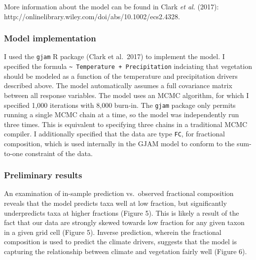 \documentclass[11pt]{article}
\begin{document}
More information about the model can be found in Clark \emph{et al.}
(2017): http://onlinelibrary.wiley.com/doi/abs/10.1002/ecs2.4328.

\hypertarget{model-implementation}{%
\subsubsection{Model implementation}\label{model-implementation}}

I used the \texttt{gjam} R package (Clark et al.~2017) to implement the
model. I specified the formula
\texttt{\textasciitilde{}\ Temperature\ +\ Precipitation} indciating
that vegetation should be modeled as a function of the temperature and
precipitation drivers described above. The model automatically assumes a
full covariance matrix between all response variables. The model uses an
MCMC algorithm, for which I specified 1,000 iterations with 8,000
burn-in. The \texttt{gjam} package only permits running a single MCMC
chain at a time, so the model was independently run three times. This is
equivalent to specifying three chains in a traditional MCMC compiler. I
additionally specified that the data are type \texttt{FC}, for
fractional composition, which is used internally in the GJAM model to
conform to the sum-to-one constraint of the data.

    \hypertarget{preliminary-results}{%
\subsubsection{Preliminary results}\label{preliminary-results}}

An examination of in-sample prediction vs.~observed fractional
composition reveals that the model predicts taxa well at low fraction,
but significantly underpredicts taxa at higher fractions (Figure 5).
This is likely a result of the fact that our data are strongly skewed
towards low fraction for any given taxon in a given grid cell (Figure
5). Inverse prediction, wherein the fractional composition is used to
predict the climate drivers, suggests that the model is capturing the
relationship between climate and vegetation fairly well (Figure 6).
 
            
    
    \begin{center}
    \end{center}
    { \hspace*{\fill} \\}
    
\end{document}
